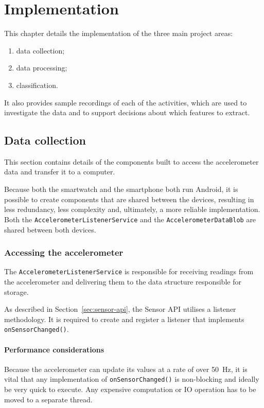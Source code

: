 \chapter{Implementation}
  This chapter details the implementation of the three main project areas:
  \begin{enumerate}
    \item data collection;
    \item data processing;
    \item classification.
  \end{enumerate}
  
  It also provides sample recordings of each of the activities, which are used to investigate the data and to support decisions about which features to extract.
  
  
  \section{Data collection}
    This section contains details of the components built to access the accelerometer data and transfer it to a computer.
    
    Because both the smartwatch and the smartphone both run Android, it is possible to create components that are shared between the devices, resulting in less redundancy, less complexity and, ultimately, a more reliable implementation. Both the \texttt{AccelerometerListenerService} and the \texttt{AccelerometerDataBlob} are shared between both devices.
    
    \subsection{Accessing the accelerometer}
      The \texttt{AccelerometerListenerService} is responsible for receiving readings from the accelerometer and delivering them to the data structure responsible for storage.
      
      As described in Section~\ref{sec:sensor-api}, the Sensor API utilises a listener methodology. It is required to create and register a listener that implements \texttt{onSensorChanged()}. 
      
      \subsubsection{Performance considerations}
        Because the accelerometer can update its values at a rate of over 50~\si{Hz}, it is vital that any implementation of \texttt{onSensorChanged()} is non-blocking and ideally be very quick to execute. Any expensive computation or IO operation has to be moved to a separate thread.
        
